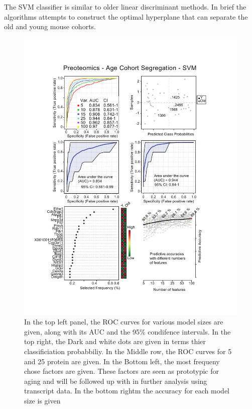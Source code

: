 \documentclass[a4paper]{book}
\begin{document}
	The SVM classifier is similar to older linear discriminant methods. In brief the algorithms attempts to construct the optimal hyperplane that can separate the old and young mouse cohorts\citep{Shawe-Taylor2011SVM}. 
	
	\begin{figure}[htb!]
		\centering
		\includegraphics[width=0.95\linewidth]{"3.Proteomics/Proteomics_Vingette_SVM_Age"}
		\caption[SVM Classifier for Young and Old Mice using Proteins]{In the top left panel, the ROC curves for various model sizes are given, along with its AUC and the 95\% condifence intervals. In the top right, the Dark and white dots are given in terms thier classificiation probabbiliy. In the Middle row, the ROC curves for 5 and 25 protein are given. In the Bottom left, the most frequeny chose factors are given. These factors are seen as prototypic for aging and will be followed up with in further analysis using transcript data. In the bottom rightm the accuracy for each model size is given}
		\label{fig:proteomicsvingettesvm}
	\end{figure}
	
\end{document}
